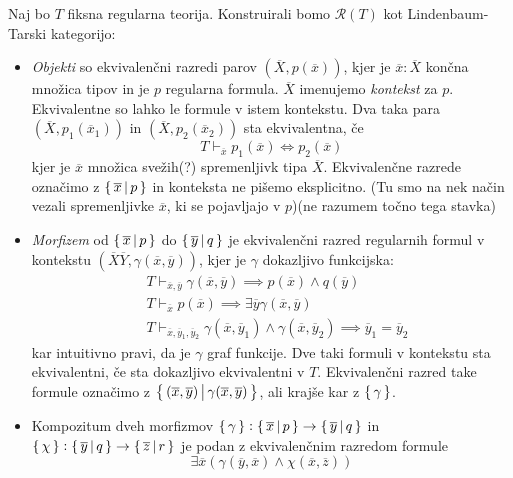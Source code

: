 \documentclass[../kategoricna_logika.tex]{subfiles}
\begin{document}
\begin{definicija}
  Naj bo $T$ fiksna regularna teorija. Konstruirali bomo $\mathcal{R}(T)$ kot Lindenbaum-Tarski kategorijo:
  \begin{itemize}
    \item \emph{Objekti} so ekvivalenčni razredi parov $(\overline{X}, p(\overline{x}))$,
      kjer je $\overline{x} : \overline{X}$ končna množica tipov in je $p$ regularna formula.
      $\overline{X}$ imenujemo \emph{kontekst} za $p$. Ekvivalentne so lahko le formule v istem kontekstu.
      Dva taka para $(\overline{X}, p_1(\overline{x}_1))$ in $(\overline{X}, p_2(\overline{x}_2))$ sta ekvivalentna, če
      $$T \vdash_{\overline{x}} p_1(\overline{x}) \Leftrightarrow p_2(\overline{x})$$
      kjer je $\overline{x}$ množica svežih(?) spremenljivk tipa $\overline{X}$.
      Ekvivalenčne razrede označimo z $\left\lbrace\,\overline{x} \,\middle|\, p\,\right\rbrace$ in konteksta ne pišemo eksplicitno.
      (Tu smo na nek način vezali spremenljivke $\overline{x}$, ki se pojavljajo v $p$)(ne razumem točno tega stavka)
    \item \emph{Morfizem} od $\left\lbrace\,\overline{x} \,\middle|\, p\,\right\rbrace$ do $\left\lbrace\,\overline{y} \,\middle|\, q\,\right\rbrace$
      je ekvivalenčni razred regularnih formul v kontekstu $(\overline{X}\overline{Y}, \gamma(\overline{x},\overline{y}))$,
      kjer je $\gamma$ dokazljivo funkcijska:
      \begin{align*}
        &T \vdash_{\overline{x},\overline{y}} \gamma(\overline{x},\overline{y})  \implies p(\overline{x}) \wedge q(\overline{y}) \\
        &T \vdash_{\overline{x}} p(\overline{x}) \implies \exists \overline{y} \gamma(\overline{x},\overline{y}) \\
        &T \vdash_{\overline{x},\overline{y}_1,\overline{y}_2} \gamma(\overline{x},\overline{y}_1) \wedge \gamma(\overline{x},\overline{y}_2) \implies \overline{y}_1 = \overline{y}_2
      \end{align*}
      kar intuitivno pravi, da je $\gamma$ graf funkcije. Dve taki formuli v kontekstu sta ekvivalentni, če sta dokazljivo ekvivalentni v $T$.
      Ekvivalenčni razred take formule označimo z $\left\lbrace\,(\overline{x},\overline{y}) \,\middle|\, \gamma(\overline{x},\overline{y})\,\right\rbrace$, ali krajše kar z $\left\lbrace\,\gamma\,\right\rbrace$.
    \item Kompozitum dveh morfizmov $\left\lbrace\,\gamma\,\right\rbrace : \left\lbrace\,\overline{x} \,\middle|\, p\,\right\rbrace \to \left\lbrace\,\overline{y} \,\middle|\, q\,\right\rbrace$ in
      $\left\lbrace\,\chi\,\right\rbrace : \left\lbrace\,\overline{y}\,\middle|\, q\,\right\rbrace \to \left\lbrace\,\overline{z}\,\middle|\, r\,\right\rbrace$ je podan z ekvivalenčnim razredom formule
      $$\exists \overline{x}(\gamma(\overline{y},\overline{x}) \wedge \chi(\overline{x},\overline{z}))$$
  \end{itemize}
\end{definicija}
\end{document}
